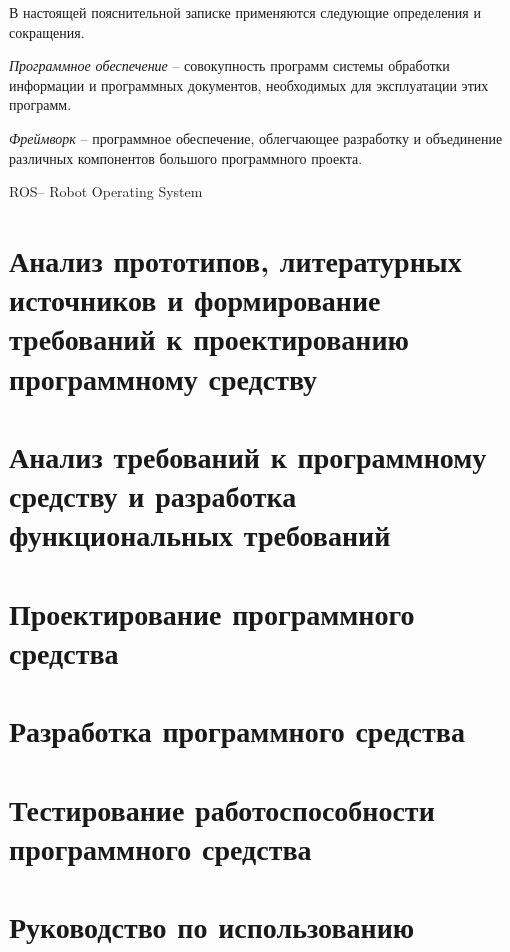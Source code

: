 



\newcommand{\appname}{ПО} 
\newcommand{\ros}{ROS}


В настоящей пояснительной записке применяются следующие определения и сокращения.

\textit{Программное обеспечение} -- совокупность программ системы обработки
информации и программных документов, необходимых для эксплуатации этих программ.


\textit{Фреймворк} -- программное обеспечение, облегчающее разработку и объединение различных компонентов большого программного проекта.

\ros -- Robot Operating System


\section{Анализ прототипов, литературных источников и формирование требований к проектированию программному средству}

\section{Анализ требований к программному средству и разработка функциональных требований}

\section{Проектирование программного средства}

\section{Разработка программного средства}

\section{Тестирование работоспособности программного средства}

\section{Руководство по использованию}

